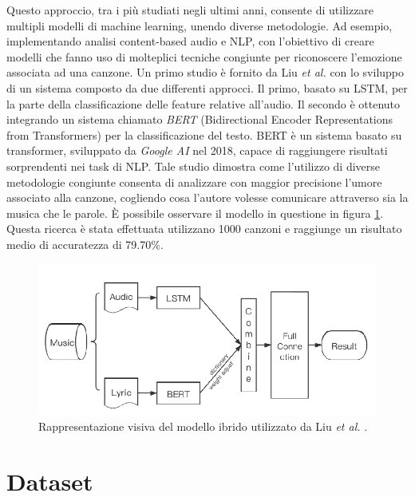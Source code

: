 \documentclass[11pt]{report}
\begin{document}
 Questo approccio, tra i più studiati negli ultimi anni, consente di utilizzare multipli modelli di machine learning, unendo diverse metodologie. Ad esempio, implementando analisi content-based audio e NLP, con l'obiettivo di creare modelli che fanno uso di molteplici tecniche congiunte per riconoscere l'emozione associata ad una canzone. Un primo studio è fornito da Liu \textit{et al. }\cite{liu2020research} con lo sviluppo di un sistema composto da due differenti approcci. Il primo, basato su LSTM, per la parte della classificazione delle feature relative all'audio. Il secondo è ottenuto integrando un sistema chiamato \textit{BERT} (Bidirectional Encoder Representations from Transformers) \cite{devlin2018bert} per la classificazione del testo. BERT è un sistema basato su transformer, sviluppato da \textit{Google AI} nel 2018, capace di raggiungere risultati sorprendenti nei task di NLP. Tale studio dimostra come l'utilizzo di diverse metodologie congiunte consenta di analizzare con maggior precisione l'umore associato alla canzone, cogliendo cosa l'autore volesse comunicare attraverso sia la musica che le parole.  È possibile osservare il modello in questione in figura \ref{fig-liu}. Questa ricerca è stata effettuata utilizzano 1000 canzoni e raggiunge un risultato medio di accuratezza di 79.70\%.

\vspace{2cm}

\begin{figure}[h]
\centering
\includegraphics[scale = 0.5]{img/Liu_model.PNG}
\caption{Rappresentazione visiva del modello ibrido utilizzato da Liu \textit{et al.} \cite{liu2020research}.}
\label{fig-liu}
\end{figure}



\chapter{Dataset}
\end{document}
